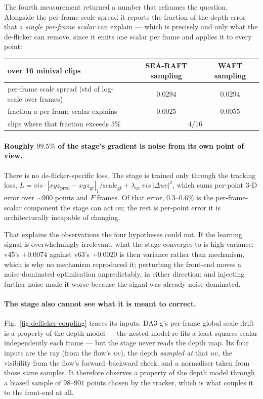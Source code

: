 \documentclass[11pt,a4paper]{article}
\begin{document}
The fourth measurement returned a number that reframes the question. Alongside the per-frame scale
spread it reports the fraction of the depth error that a \emph{single per-frame scalar} can explain
--- which is precisely and only what the de-flicker can remove, since it emits one scalar per frame
and applies it to every point:

\begin{center}\small
\begin{tabular}{lcc}
\toprule
over 16 minival clips & SEA-RAFT sampling & WAFT sampling \\
\midrule
per-frame scale spread (std of log-scale over frames) & $0.0294$ & $0.0294$ \\
fraction a per-frame scalar explains                  & $0.0025$ & $0.0055$ \\
clips where that fraction exceeds $5\%$               & \multicolumn{2}{c}{$4/16$} \\
\bottomrule
\end{tabular}
\end{center}

\paragraph{Roughly $99.5\%$ of the stage's gradient is noise from its own point of view.} There is
no de-flicker-specific loss. The stage is trained only through the tracking loss,
$L = vis\cdot|xyz_{\text{pred}}-xyz_{\text{gt}}|_1/\text{scale}_{\text{gt}} + \lambda_{uv}\,vis\,
|\Delta uv|^2$, which sums per-point 3-D error over ${\sim}900$ points and $F$ frames. Of that
error, $0.3$--$0.6\%$ is the per-frame-scalar component the stage can act on; the rest is per-point
error it is architecturally incapable of changing.

That explains the observations the four hypotheses could not. If the learning signal is
overwhelmingly irrelevant, what the stage converges to is high-variance: v45's $+0.0074$ against
v63's $+0.0020$ is then variance rather than mechanism, which is why no mechanism reproduced it;
perturbing the front-end moves a noise-dominated optimisation unpredictably, in either direction;
and injecting further noise made it worse because the signal was already noise-dominated.

\paragraph{The stage also cannot see what it is meant to correct.}
Fig.~\ref{fig:deflicker-coupling} traces its inputs. DA3-g's per-frame global scale drift is a
property of the depth model --- the nested model re-fits a least-squares scalar independently each
frame --- but the stage never reads the depth map. Its four inputs are the ray (from the flow's
$uv$), the depth \emph{sampled at} that $uv$, the visibility from the flow's forward--backward
check, and a normaliser taken from those same samples. It therefore observes a property of the
depth model through a biased sample of $98$--$901$ points chosen by the tracker, which is what couples
it to the front-end at all.
\end{document}
